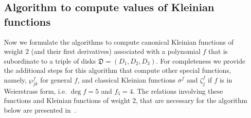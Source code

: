 \documentclass{amsart}
\numberwithin{equation}{section}
\theoremstyle{definition}
\theoremstyle{remark}
\begin{document}
	\subsection{Algorithm to compute values of Kleinian functions}
	Now we formulate the algorithms to compute canonical Kleinian functions of weight $2$ (and their first derivatives) associated with a polynomial $f$ that is subordinate to a triple of disks $\mathfrak D = (D_1,D_2,D_3)$. For completeness we provide the additional steps for this algorithm that compute other special functions, namely, $\wp^f_{jk}$ for general $f$, and classical Kleinian functions $\sigma^f$ and $\zeta_j^f$ if $f$ is in Weierstrass form, i.e. $\deg f = 5$ and $f_5 = 4$. The relations involving these functions and Kleinian functions of weight 2, that are necessary for the algorithm below are presented in~\cite{KleinianWeight2}.
	
\end{document}
